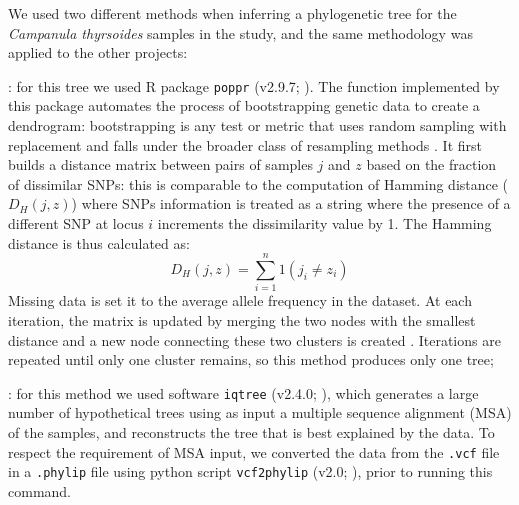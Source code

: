 \documentclass[a4paper, 12pt]{report}
\begin{document}
We used two different methods when inferring a phylogenetic tree for the \textit{Campanula thyrsoides} samples in the study, and the same methodology was applied to the other projects:
\vspace{-1.5em}
\begin{description}\setlength\itemsep{-0.2em}
	\item [Neighbor joining, a distance-based method]: for this tree we used R package \texttt{poppr} (v2.9.7; \cite{kamvarPopprGeneticAnalysis2013}). The function implemented by this package automates the process of bootstrapping genetic data to create a dendrogram: bootstrapping is any test or metric that uses random sampling with replacement and falls under the broader class of resampling methods \parencite{ojhaChapter5Computational2022a}. It first builds a distance matrix between pairs of samples $j$ and $z$ based on the fraction of dissimilar SNPs: this is comparable to the computation of Hamming distance ($D_H(j,z)$) where SNPs information is treated as a string where the presence of a different SNP at locus $i$ increments the dissimilarity value by 1. The Hamming distance is thus calculated as:
	\begin{equation}
		D_H(j, z) = \sum^n_{i=1} 1(j_i \neq z_i)
	\end{equation} 
	Missing data is set it to the average allele frequency in the dataset. At each iteration, the matrix is updated by merging the two nodes with the smallest distance and a new node connecting these two clusters is created \parencite{zouCommonMethodsPhylogenetic2024}. Iterations are repeated until only one cluster remains, so this method produces only one tree;
	\item [Maximum likelihood, a character-based method]: for this method we used software \texttt{iqtree} (v2.4.0; \cite{minhIQTREE2New2020}), which generates a large number of hypothetical trees using as input a multiple sequence alignment (MSA) of the samples, and reconstructs the tree that is best explained by the data. To respect the requirement of MSA input, we converted the data from the \texttt{.vcf} file in a \texttt{.phylip} file using python script \texttt{vcf2phylip} (v2.0; \cite{ortizVcf2phylipV20Convert2019}), prior to running this command.
	

\end{description}
\end{document}
